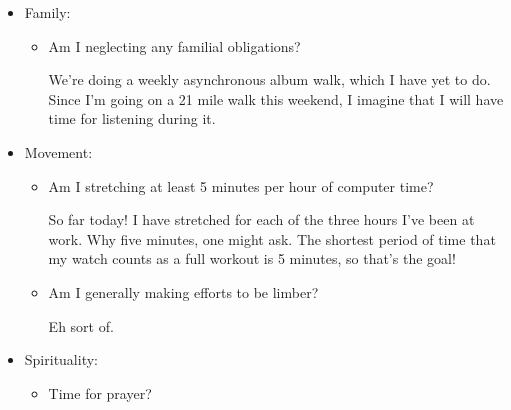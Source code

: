 \documentclass[12pt]{article}
\renewcommand{\,}{\textsuperscript{,}}
\begin{document}
\begin{enumerate}
\begin{itemize}
\begin{itemize}
Nor entirely sure, but had a pastry which I'll call breakfast and am actively working through a bowl of oats.  
Also packed a lunch, so we'll see how that is.

\item Did I eat dinner?

Yesterday I did!

\item Water?

Drinking it right now. Want to empty the water bottle today, which shouldn't be too hard, since I'm trapped in the bowels of the chemistry department.\footnote{it is burning hot down here. Apparently there was a heater stuck to on until the other day down here}

\end{itemize}

\item Family:

\begin{itemize}

\item Am I neglecting any familial obligations?

We're doing a weekly asynchronous album walk, which I have yet to do.  
Since I'm going on a 21 mile walk this weekend, I imagine that I will have time for listening during it.

\end{itemize}

\item Movement:

\begin{itemize}

\item Am I stretching at least 5 minutes per hour of computer time?

So far today! I have stretched for each of the three hours I've been at work.  
Why five minutes, one might ask.  
The shortest period of time that my watch counts as a full workout is 5 minutes, so that's the goal!

\item Am I generally making efforts to be limber?

Eh sort of.

\end{itemize}

\item Spirituality:

\begin{itemize}

\item Time for prayer?


\end{itemize}
\end{itemize}
\end{enumerate}
\end{document}
